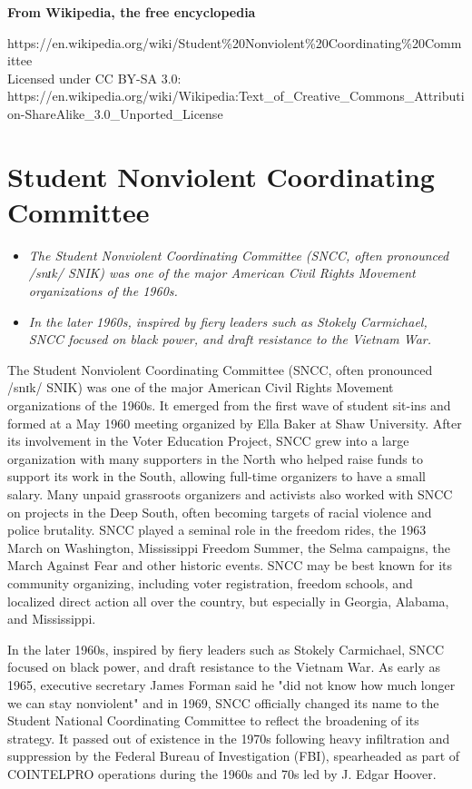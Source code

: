 \textbf{From Wikipedia, the free encyclopedia}

https://en.wikipedia.org/wiki/Student\%20Nonviolent\%20Coordinating\%20Committee\\
Licensed under CC BY-SA 3.0:\\
https://en.wikipedia.org/wiki/Wikipedia:Text\_of\_Creative\_Commons\_Attribution-ShareAlike\_3.0\_Unported\_License

\section{Student Nonviolent Coordinating
Committee}\label{student-nonviolent-coordinating-committee}

\begin{itemize}
\item
  \emph{The Student Nonviolent Coordinating Committee (SNCC, often
  pronounced /snɪk/ SNIK) was one of the major American Civil Rights
  Movement organizations of the 1960s.}
\item
  \emph{In the later 1960s, inspired by fiery leaders such as Stokely
  Carmichael, SNCC focused on black power, and draft resistance to the
  Vietnam War.}
\end{itemize}

The Student Nonviolent Coordinating Committee (SNCC, often pronounced
/snɪk/ SNIK) was one of the major American Civil Rights Movement
organizations of the 1960s. It emerged from the first wave of student
sit-ins and formed at a May 1960 meeting organized by Ella Baker at Shaw
University. After its involvement in the Voter Education Project, SNCC
grew into a large organization with many supporters in the North who
helped raise funds to support its work in the South, allowing full-time
organizers to have a small salary. Many unpaid grassroots organizers and
activists also worked with SNCC on projects in the Deep South, often
becoming targets of racial violence and police brutality. SNCC played a
seminal role in the freedom rides, the 1963 March on Washington,
Mississippi Freedom Summer, the Selma campaigns, the March Against Fear
and other historic events. SNCC may be best known for its community
organizing, including voter registration, freedom schools, and localized
direct action all over the country, but especially in Georgia, Alabama,
and Mississippi.

In the later 1960s, inspired by fiery leaders such as Stokely
Carmichael, SNCC focused on black power, and draft resistance to the
Vietnam War. As early as 1965, executive secretary James Forman said he
"did not know how much longer we can stay nonviolent" and in 1969, SNCC
officially changed its name to the Student National Coordinating
Committee to reflect the broadening of its strategy. It passed out of
existence in the 1970s following heavy infiltration and suppression by
the Federal Bureau of Investigation (FBI), spearheaded as part of
COINTELPRO operations during the 1960s and 70s led by J. Edgar Hoover.

